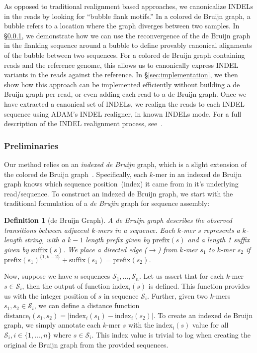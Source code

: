 \documentclass{bioinfo}
\newtheorem{defn}{Definition}
\begin{document}
\begin{methods}
As opposed to traditional realignment based approaches, we canonicalize INDELs
in the reads by looking for ``bubble flank motifs.'' In a colored de Bruijn
graph, a bubble refers to a location where the graph diverges between two
samples. In \S\ref{sec:formulation}, we demonstrate how we can use the
reconvergence of the de Bruijn graph in the flanking sequence around a bubble
to define provably canonical alignments of the bubble between two sequences.
For a colored de Bruijn graph containing reads and the reference genome, this
allows us to canonically express INDEL variants in the reads against the
reference. In \S\ref{sec:implementation}, we then show how this approach
can be implemented efficiently without building a de Bruijn graph per read,
or even adding each read to a de Bruijn graph. Once we have extracted a
canonical set of INDELs, we realign the reads to each INDEL sequence using
\textsc{ADAM}'s INDEL realigner, in known INDELs mode. For a full description
of the INDEL realignment process, see~\citet{nothaft15avocado}.

\subsubsection{Preliminaries}
\label{sec:formulation}

Our method relies on an \emph{indexed de Bruijn} graph, which is a slight
extension of the colored de Bruijn graph~\citep{iqbal12}. Specifically, each
$k$-mer in an indexed de Bruijn graph knows which sequence position~(index)
it came from in it's underlying read/sequence. To construct an indexed de
Bruijn graph, we start with the traditional formulation of a \emph{de Brujin}
graph for sequence assembly:

\begin{defn}[de Bruijn Graph]
\label{defn:dbg}
A de Bruijn graph describes the observed transitions between adjacent $k$-mers in a sequence. Each
$k$-mer $s$ represents a $k$-length string, with a $k - 1$ length prefix given by $\text{prefix}(s)$ and a
length 1 suffix given by $\text{suffix}(s)$. We place a directed edge ($\rightarrow$) from $k$-mer $s_1$ to
$k$-mer $s_2$ if $\text{prefix}(s_1)^{\{1, k - 2\}} + \text{suffix}(s_1) = \text{prefix}(s_2)$.
\end{defn}

Now, suppose we have $n$ sequences $\mathcal{S}_1, \dots, \mathcal{S}_n$. Let us assert that for each
$k$-mer $s \in \mathcal{S}_i$, then the output of function $\text{index}_i(s)$ is defined. This function
provides us with the integer position of $s$ in sequence $\mathcal{S}_i$. Further, given two $k$-mers
$s_1, s_2 \in \mathcal{S}_i$, we can define a distance function
$\text{distance}_i(s_1, s_2) = | \text{index}_i(s_1) - \text{index}_i(s_2) |$. To create an indexed
de Bruijn graph, we simply annotate each $k$-mer $s$ with the $\text{index}_i(s)$ value for all
$\mathcal{S}_i, i \in \{1, \dots, n\}$ where $s \in \mathcal{S}_i$. This index value is trivial to log when
creating the original de Bruijn graph from the provided sequences.


\end{methods}
\end{document}
